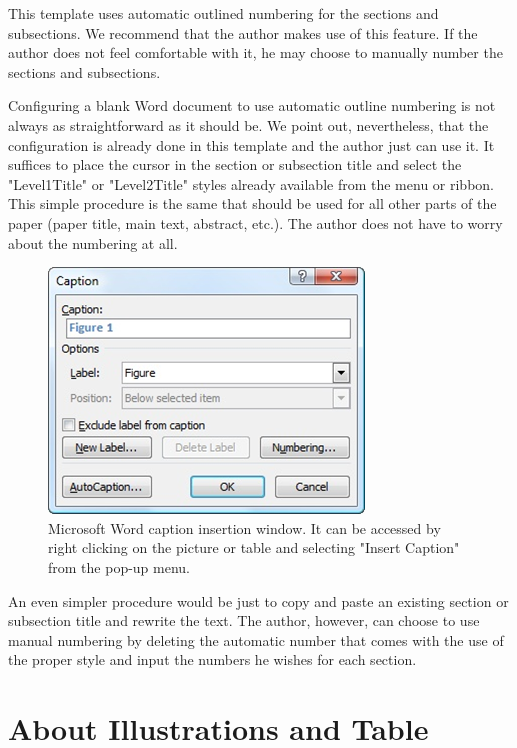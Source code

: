\documentclass[10pt]{imeko_acta}
\begin{document}
This template uses automatic outlined numbering for the sections and subsections. We recommend that the author makes use of this feature. If the author does not feel comfortable with it, he may choose to manually number the sections and subsections.

Configuring a blank Word document to use automatic outline numbering is not always as straightforward as it should be. We point out, nevertheless, that the configuration is already done in this template and the author just can use it. It suffices to place the cursor in the section or subsection title and select the "Level1Title" or "Level2Title" styles already available from the menu or ribbon. This simple procedure is the same that should be used for all other parts of the paper (paper title, main text, abstract, etc.). The author does not have to worry about the numbering at all.

\begin{figure}[!tb]
	\centering
	\includegraphics[width=.9\columnwidth]{image3}
	\caption{Microsoft Word caption insertion window. It can be accessed by right clicking on the picture or table and selecting "Insert Caption" from the pop-up menu.}
	\label{fig:image3}
\end{figure}

An even simpler procedure would be just to copy and paste an existing section or subsection title and rewrite the text. The author, however, can choose to use manual numbering by deleting the automatic number that comes with the use of the proper style and input the numbers he wishes for each section.



\section{About Illustrations and Table}
\end{document}
